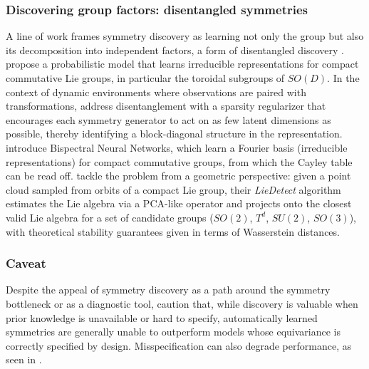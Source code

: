 \documentclass[mathematics,review,submit,moreauthors]{Definitions/mdpi}
\begin{document}
\subsubsection{Discovering group factors: disentangled symmetries}
A line of work frames symmetry discovery as learning not only the group but also its decomposition into independent factors, a form of disentangled discovery \citep{higgins2018}.
\citet{cohen2014} propose a probabilistic model that learns irreducible representations for compact commutative Lie groups, in particular the toroidal subgroups of $SO(D)$.
In the context of dynamic environments where observations are paired with transformations, \citet{quessard2020anips} address disentanglement with a sparsity regularizer that encourages each symmetry generator to act on as few latent dimensions as possible, thereby identifying a block-diagonal structure in the representation.
\citet{sanborn2022} introduce Bispectral Neural Networks, which learn a Fourier basis (irreducible representations) for compact commutative groups, from which the Cayley table can be read off.
\citet{ennes2025fcm} tackle the problem from a geometric perspective: given a point cloud sampled from orbits of a compact Lie group, their \textit{LieDetect} algorithm estimates the Lie algebra via a PCA-like operator and projects onto the closest valid Lie algebra for a set of candidate groups ($SO(2)$, $T^d$, $SU(2)$, $SO(3)$), with theoretical stability guarantees given in terms of Wasserstein distances.


\subsubsection{Caveat}
Despite the appeal of symmetry discovery as a path around the symmetry bottleneck or as a diagnostic tool, \citet{rath2024air} caution that, while discovery is valuable when prior knowledge is unavailable or hard to specify, automatically learned symmetries are generally unable to outperform models whose equivariance is correctly specified by design.
Misspecification can also degrade performance, as seen in .
\end{document}
